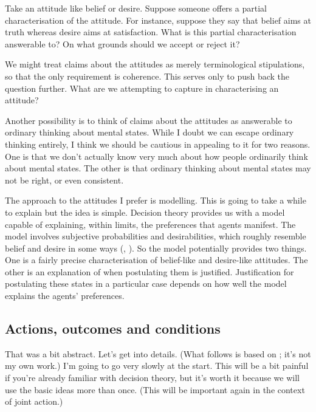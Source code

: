 \documentclass[12pt,\papersize]{extarticle}
\begin{document}
Take an attitude like belief or desire.
Suppose someone offers a partial characterisation of the attitude.
For instance, 
suppose they say that belief aims at truth whereas desire aims at satisfaction.
What is this partial characterisation answerable to?
On what grounds should we accept or reject it?

We might treat claims about the attitudes as merely terminological stipulations, so that the only requirement is coherence.
This serves only to push back the question further.
What are we attempting to capture in characterising an attitude?  

Another possibility is to think of claims about the attitudes as answerable to ordinary thinking about mental states.
While I doubt we can escape ordinary thinking entirely, I think we should be cautious in appealing to it for two reasons.
One is that we don't actually know very much about how people ordinarily think about mental states.
The other is that ordinary thinking about mental states may not be right, or even consistent.

The approach to the attitudes I prefer is modelling.
This is going to take a while to explain but the idea is simple.
Decision theory provides us with a model capable of explaining, within limits, the preferences that agents manifest.
The model involves subjective probabilities and desirabilities, which roughly resemble belief and desire in some ways (\citealp[p.\ 59]{Jeffrey:1983oe}, \citealp{Davidson:1985qg}). 
So the model potentially provides two things.
One is a fairly precise characterisation of belief-like and desire-like attitudes.
The other is an explanation of when postulating them is justified.
Justification for postulating these states in a particular case depends on how well the model explains the agents' preferences.

\subsection{Actions, outcomes and conditions}
That was a bit abstract.
Let's get into details.
(What follows is based on \citealp{Jeffrey:1983oe}; it's not my own work.) 
I'm going to go very slowly at the start. 
This will be a bit painful if you're already familiar with decision theory, but it's worth it because we will use the basic ideas more than once.
(This will be important again in the context of joint action.)
\end{document}
